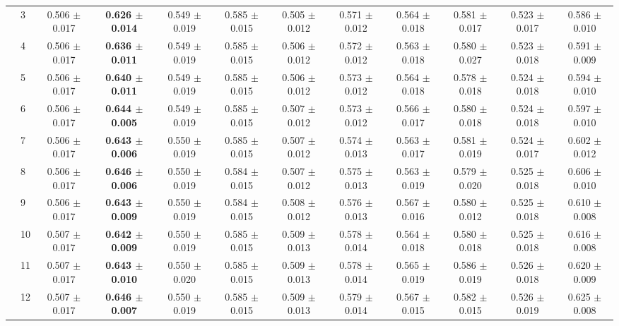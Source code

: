\begin{table*}[t]
{\begin{tabular}{%
  ll
  @{\quad}
  c@{\hskip 4pt}c
  @{\quad\quad}
  c@{\hskip 4pt}c
  @{\quad\quad}
  c@{\hskip 4pt}c
  @{\quad\quad}
  c@{\hskip 4pt}c
  @{\quad\quad}
  c@{\hskip 4pt}c
}
        & 3 & 0.506 $\pm$ 0.017 & \textbf{0.626 $\pm$ 0.014} & 0.549 $\pm$ 0.019 & 0.585 $\pm$ 0.015 & 0.505 $\pm$ 0.012 & 0.571 $\pm$ 0.012 & 0.564 $\pm$ 0.018 & 0.581 $\pm$ 0.017 & 0.523 $\pm$ 0.017 & 0.586 $\pm$ 0.010 \\
        & 4 & 0.506 $\pm$ 0.017 & \textbf{0.636 $\pm$ 0.011} & 0.549 $\pm$ 0.019 & 0.585 $\pm$ 0.015 & 0.506 $\pm$ 0.012 & 0.572 $\pm$ 0.012 & 0.563 $\pm$ 0.018 & 0.580 $\pm$ 0.027 & 0.523 $\pm$ 0.018 & 0.591 $\pm$ 0.009 \\
        & 5 & 0.506 $\pm$ 0.017 & \textbf{0.640 $\pm$ 0.011} & 0.549 $\pm$ 0.019 & 0.585 $\pm$ 0.015 & 0.506 $\pm$ 0.012 & 0.573 $\pm$ 0.012 & 0.564 $\pm$ 0.018 & 0.578 $\pm$ 0.018 & 0.524 $\pm$ 0.018 & 0.594 $\pm$ 0.010 \\
        & 6 & 0.506 $\pm$ 0.017 & \textbf{0.644 $\pm$ 0.005} & 0.549 $\pm$ 0.019 & 0.585 $\pm$ 0.015 & 0.507 $\pm$ 0.012 & 0.573 $\pm$ 0.012 & 0.566 $\pm$ 0.017 & 0.580 $\pm$ 0.018 & 0.524 $\pm$ 0.018 & 0.597 $\pm$ 0.010 \\
        & 7 & 0.506 $\pm$ 0.017 & \textbf{0.643 $\pm$ 0.006} & 0.550 $\pm$ 0.019 & 0.585 $\pm$ 0.015 & 0.507 $\pm$ 0.012 & 0.574 $\pm$ 0.013 & 0.563 $\pm$ 0.017 & 0.581 $\pm$ 0.019 & 0.524 $\pm$ 0.017 & 0.602 $\pm$ 0.012 \\
        & 8 & 0.506 $\pm$ 0.017 & \textbf{0.646 $\pm$ 0.006} & 0.550 $\pm$ 0.019 & 0.584 $\pm$ 0.015 & 0.507 $\pm$ 0.012 & 0.575 $\pm$ 0.013 & 0.563 $\pm$ 0.019 & 0.579 $\pm$ 0.020 & 0.525 $\pm$ 0.018 & 0.606 $\pm$ 0.010 \\
        & 9 & 0.506 $\pm$ 0.017 & \textbf{0.643 $\pm$ 0.009} & 0.550 $\pm$ 0.019 & 0.584 $\pm$ 0.015 & 0.508 $\pm$ 0.012 & 0.576 $\pm$ 0.013 & 0.567 $\pm$ 0.016 & 0.580 $\pm$ 0.012 & 0.525 $\pm$ 0.018 & 0.610 $\pm$ 0.008 \\
        & 10 & 0.507 $\pm$ 0.017 & \textbf{0.642 $\pm$ 0.009} & 0.550 $\pm$ 0.019 & 0.585 $\pm$ 0.015 & 0.509 $\pm$ 0.013 & 0.578 $\pm$ 0.014 & 0.564 $\pm$ 0.018 & 0.580 $\pm$ 0.018 & 0.525 $\pm$ 0.018 & 0.616 $\pm$ 0.008 \\
        & 11 & 0.507 $\pm$ 0.017 & \textbf{0.643 $\pm$ 0.010} & 0.550 $\pm$ 0.020 & 0.585 $\pm$ 0.015 & 0.509 $\pm$ 0.013 & 0.578 $\pm$ 0.014 & 0.565 $\pm$ 0.019 & 0.586 $\pm$ 0.019 & 0.526 $\pm$ 0.018 & 0.620 $\pm$ 0.009 \\
        & 12 & 0.507 $\pm$ 0.017 & \textbf{0.646 $\pm$ 0.007} & 0.550 $\pm$ 0.019 & 0.585 $\pm$ 0.015 & 0.509 $\pm$ 0.013 & 0.579 $\pm$ 0.014 & 0.567 $\pm$ 0.015 & 0.582 $\pm$ 0.015 & 0.526 $\pm$ 0.019 & 0.625 $\pm$ 0.008 \\

\end{tabular}}
\end{table*}
